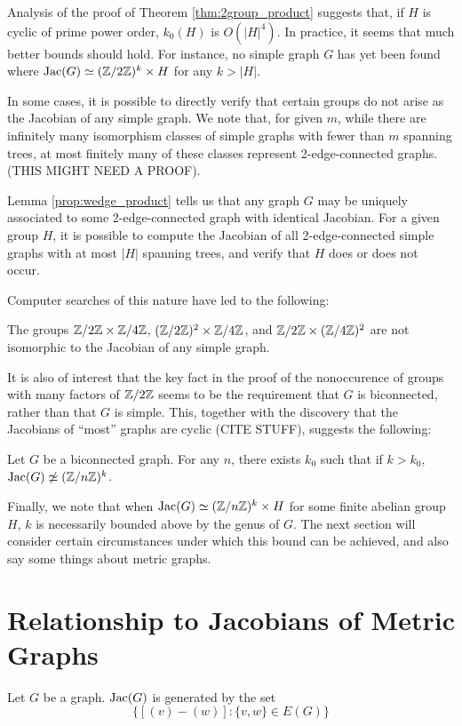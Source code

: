 \documentclass{amsart}
\begin{document}
Analysis of the proof of Theorem \ref{thm:2group_product} suggests
that, if $H$ is cyclic of prime power order, $k_0(H)$ is
$O(|H|^4)$. In practice, it seems that much better bounds should
hold. For instance, no simple graph $G$ has yet been found where
$\operatorname{Jac}(G) \simeq (\mathbb{Z}/2\mathbb{Z})^k \times H$ for any $k > |H|$.

In some cases, it is possible to directly verify that certain groups
do not arise as the Jacobian of any simple graph. We note that, for
given $m$, while there are infinitely many isomorphism classes of
simple graphs with fewer than $m$ spanning trees, at most finitely
many of these classes represent 2-edge-connected graphs. (THIS MIGHT
NEED A PROOF).

Lemma \ref{prop:wedge_product} tells us that any graph $G$ may be
uniquely associated to some 2-edge-connected graph with identical
Jacobian. For a given group $H$, it is possible to compute the
Jacobian of all 2-edge-connected simple graphs with at most $|H|$
spanning trees, and verify that $H$ does or does not occur. 

Computer searches of this nature have led to the following:

\begin{thm}
  The groups $\mathbb{Z}/2\mathbb{Z} \times \mathbb{Z}/4\mathbb{Z}$, $(\mathbb{Z}/2\mathbb{Z})^2 \times \mathbb{Z}/4\mathbb{Z}$, and
  $\mathbb{Z}/2\mathbb{Z} \times (\mathbb{Z}/4\mathbb{Z})^2$ are not isomorphic to the Jacobian of any
  simple graph.
\end{thm}

It is also of interest that the key fact in the proof of the
nonoccurence of groups with many factors of $\mathbb{Z}/2\mathbb{Z}$ seems to be the
requirement that $G$ is biconnected, rather than that $G$ is
simple. This, together with the discovery that the Jacobians of
``most'' graphs are cyclic (CITE STUFF), suggests the following:

\begin{conj}
  Let $G$ be a biconnected graph. For any $n$, there exists $k_0$ such
  that if $k > k_0$, $\operatorname{Jac}(G) \not\simeq (\mathbb{Z}/n\mathbb{Z})^k$.
\end{conj}

Finally, we note that when $\operatorname{Jac}(G) \simeq (\mathbb{Z}/n\mathbb{Z})^k \times H$ for
some finite abelian group $H$, $k$ is necessarily bounded above by the
genus of $G$. The next section will consider certain circumstances
under which this bound can be achieved, and also say some things about
metric graphs.

\section{Relationship to Jacobians of Metric Graphs}
\begin{lem}
  \label{lem:jac_generators}
  Let $G$ be a graph. $\operatorname{Jac}(G)$ is generated by the set \[\{[(v) -
  (w)]: \{v, w\} \in E(G)\}\]
\end{lem}
\end{document}
